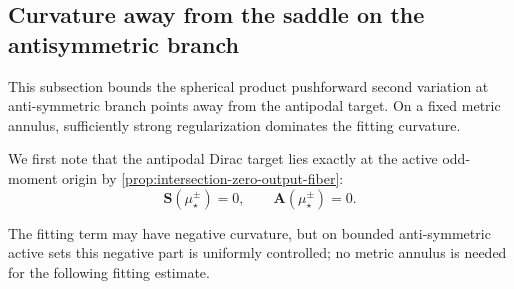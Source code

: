 
\subsection{Curvature away from the saddle on the antisymmetric branch}
\label{subsec:curvature-away-from-saddle-on-antisymmetric}
This subsection bounds the spherical product pushforward second variation at
anti-symmetric branch points away from the antipodal target.  On a fixed
metric annulus, sufficiently strong regularization dominates the fitting curvature.

We first note that the antipodal Dirac target lies exactly at the active
odd-moment origin by \cref{prop:intersection-zero-output-fiber}:
\[
    \mathbf S(\mu_\star^\pm)=0,
    \qquad
    \mathbf A(\mu_\star^\pm)=0.
\]

The fitting term may have negative curvature, but on bounded anti-symmetric
active sets this negative part is uniformly controlled; no metric annulus is
needed for the following fitting estimate.

